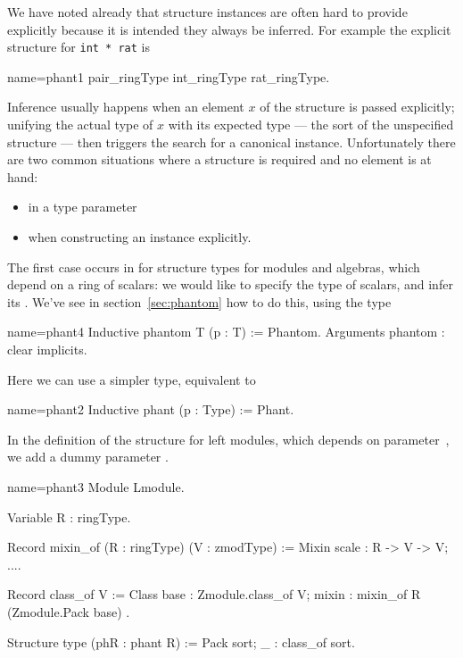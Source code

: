 \label{sec:phant}

We have noted already that structure instances are often hard to
provide explicitly because it is intended they always be inferred.
For example the explicit  structure for \lstinline/int * rat/ is

\begin{coq}{name=phant1}{}
pair_ringType int_ringType rat_ringType.
\end{coq}

Inference usually happens when an element $x$ of the structure is
passed explicitly; unifying the actual type of $x$ with its expected
type --- the sort of the unspecified structure --- then triggers the
search for a canonical instance.
Unfortunately there are two common situations where a structure is
required and no element is at hand:
\begin{itemize}
\item in a type parameter
\item when constructing an instance explicitly.
\end{itemize}
The first case occurs in  for structure types for modules
and algebras, which depend on a ring of scalars: we would like to
specify the type of scalars, and infer its .  We've see in
section~\ref{sec:phantom} how to do this, using the  type

\begin{coq}{name=phant4}{}
Inductive phantom T (p : T) := Phantom.
Arguments phantom : clear implicits.
\end{coq}

Here we can use a simpler type, equivalent to 

\begin{coq}{name=phant2}{}
Inductive phant (p : Type) := Phant.
\end{coq}

In the definition of the structure  for left modules, which depends on
 parameter~, we add a dummy  parameter .

\begin{coq}{name=phant3}{}
Module Lmodule.

Variable R : ringType.

Record mixin_of (R : ringType) (V : zmodType) := Mixin {
  scale : R -> V -> V;
  ...}.

Record class_of V := Class {
  base : Zmodule.class_of V;
  mixin : mixin_of R (Zmodule.Pack base)
}.

Structure type (phR : phant R) := Pack {sort; _ : class_of sort}.
\end{coq}

